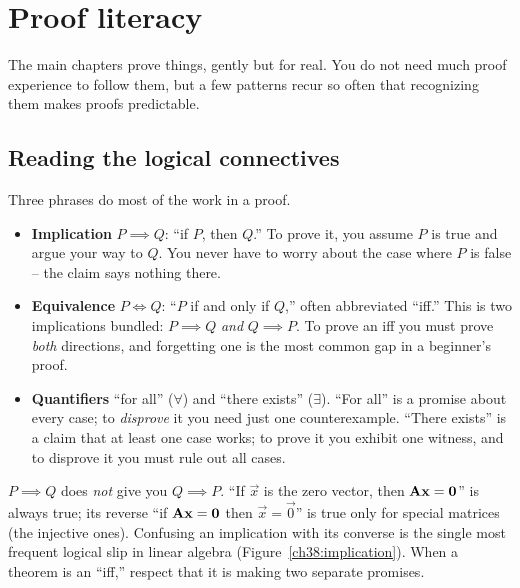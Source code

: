 \section{Proof literacy}

The main chapters prove things, gently but for real. You do not need much proof
experience to follow them, but a few patterns recur so often that recognizing them makes
proofs predictable.

\subsection{Reading the logical connectives}

Three phrases do most of the work in a proof.

\begin{itemize}
  \item \textbf{Implication} $P \implies Q$: ``if $P$, then $Q$.'' To prove it, you assume
        $P$ is true and argue your way to $Q$. You never have to worry about the case
        where $P$ is false -- the claim says nothing there.
  \item \textbf{Equivalence} $P \iff Q$: ``$P$ if and only if $Q$,'' often abbreviated
        ``iff.'' This is two implications bundled: $P \implies Q$ \emph{and} $Q \implies
        P$. To prove an iff you must prove \emph{both} directions, and forgetting one is
        the most common gap in a beginner's proof.
  \item \textbf{Quantifiers} ``for all'' ($\forall$) and ``there exists'' ($\exists$).
        ``For all'' is a promise about every case; to \emph{disprove} it you need just one
        counterexample. ``There exists'' is a claim that at least one case works; to prove
        it you exhibit one witness, and to disprove it you must rule out all cases.
\end{itemize}

\begin{trapbox}
$P \implies Q$ does \emph{not} give you $Q \implies P$. ``If $\vec{x}$ is the zero vector,
then $\mathbf{A}\mathbf{x} = \mathbf{0}$'' is always true; its reverse ``if $\mathbf{A}\mathbf{x} =
\mathbf{0}$ then $\vec{x} = \vec{0}$'' is true only for special matrices (the injective
ones). Confusing an implication with its converse is the single most frequent logical slip
in linear algebra (Figure~\ref{ch38:implication}). When a theorem is an ``iff,'' respect that
it is making two separate promises.
\end{trapbox}

